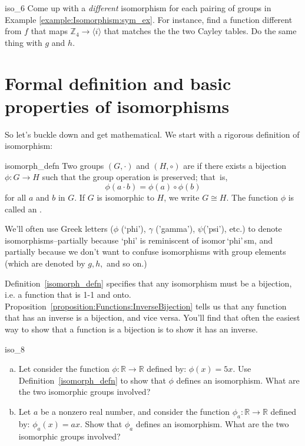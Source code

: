  \begin{exercise}{iso_6}
 Come up with a \emph{different} isomorphism for each pairing of groups in Example \ref{example:Isomorphism:sym_ex}. For instance, find a  function  different from $f$ that maps ${\mathbb Z_4} \longrightarrow \langle i \rangle$  that matches the the two Cayley tables. Do the same thing with $g$ and $h$.
 \end{exercise}
  
\section{Formal definition and basic properties of isomorphisms}
\label{sec:Isomorphism:FormalDefinition}

So let's buckle down and get mathematical. We start with a rigorous definition of isomorphism:

\begin{defn}{isomorph_defn}
Two groups $(G, \cdot)$ and $(H, \circ)$ are  if there exists a bijection $\phi : G \rightarrow H$ such that the group operation is preserved;  that~is, 
\[
\phi( a \cdot b) = \phi( a) \circ \phi( b)
\]
for all $a$ and $b$ in $G$. If $G$ is isomorphic to $H$, we write $G \cong H$. The function $\phi$ is called an . 
\end{defn}

\begin{rem}
We'll often use Greek letters ($\phi$ (`phi'), $\gamma$ ('gamma'), $\psi$('psi'), etc.) to denote isomorphisms--partially because `phi' is reminiscent of isomor$\,$`phi'$\,$sm, and partially because we don't want to confuse isomorphisms with group elements  (which are denoted by $g,h,$ and so on.)
\end{rem}

\begin{rem}
Definition~\ref{isomorph_defn} specifies that any isomorphism must be a bijection, i.e. a function that is 1-1 and onto.  Proposition~\ref{proposition:Functions:InverseBijection} tells us that any function that has an inverse is a bijection, and vice versa. You'll find that often the easiest way to show that a function is a bijection is to show it has an inverse.   
\end{rem}


\begin{exercise}{iso_8}
\begin{enumerate}[(a)]
\item
Let consider the function $\phi : \mathbb{R} \rightarrow \mathbb{R}$ defined by:  $\phi(x) = 5x$.  Use Definition~\ref{isomorph_defn} to show that $\phi$ defines an isomorphism. What are the two isomorphic groups involved?
\item
Let $a$ be a nonzero real number, and consider the function $\phi_a : \mathbb{R} \rightarrow \mathbb{R}$ defined by:  $\phi_a(x) = ax$.  Show that $\phi_a$ defines an isomorphism. What are the two isomorphic groups involved?
\end{enumerate}
\end{exercise}

